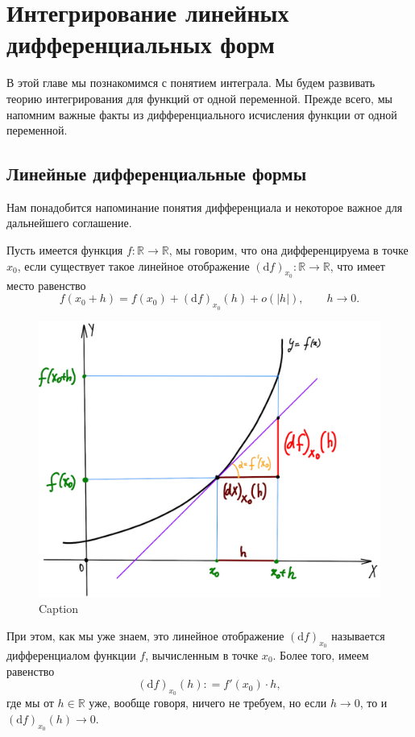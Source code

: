 \chapter{Интегрирование линейных дифференциальных форм}

В этой главе мы познакомимся с понятием интеграла. Мы будем развивать теорию интегрирования для функций от одной переменной. Прежде всего, мы напомним важные факты из дифференциального исчисления функции от одной переменной.

\section{Линейные дифференциальные формы}

Нам понадобится напоминание понятия дифференциала и некоторое важное для дальнейшего соглашение.

Пусть имеется функция $f:\mathbb{R} \to \mathbb{R}$, мы говорим, что она дифференцируема в точке $x_0$, если существует такое линейное отображение $(\mathrm{d}f)_{x_0}: \mathbb{R} \to \mathbb{R}$, что имеет место равенство
\[
 f(x_0 + h) = f(x_0) + (\mathrm{d}f)_{x_0}(h) + o(|h|), \qquad h \to 0.
\]

\begin{figure}[h!]
    \centering
    \includegraphics[scale=0.5]{images/df=f'dx.jpg}
    \caption{Caption}
    \label{fig:enter-label}
\end{figure}

При этом, как мы уже знаем, это линейное отображение $(\mathrm{d}f)_{x_0}$ называется дифференциалом функции $f$, вычисленным в точке $x_0$. Более того, имеем равенство
\[
 (\mathrm{d}f)_{x_0}(h): = f'(x_0)\cdot h, 
\]
где мы от $h \in \mathbb{R}$ уже, вообще говоря, ничего не требуем, но если $h\to 0$, то и $(\mathrm{d}f)_{x_0}(h) \to 0.$

